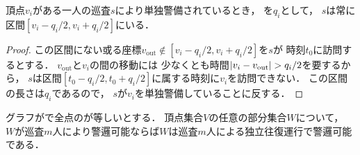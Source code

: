 \begin{lemm}
  \label{lemm:RangeOfPatrollerOnLine}
  頂点$v_i$がある一人の巡査$s$により単独警備されているとき，
  {\maxIdletime}を$q_i$として，
  $s$は常に区間$[v_i - q_i/2, v_i + q_i/2]$にいる．
\end{lemm}
\begin{proof}
  \newcommand{\vout}{v_{\mathrm{out}}}
  この区間にない或る座標$\vout \notin [v_i - q_i/2, v_i + q_i/2]$を$s$が
  時刻$t_0$に訪問するとする．
  $\vout$と$v_i$の間の移動には
  少なくとも時間$\abs{v_i - \vout} > q_i / 2$を要するから，
  $s$は区間$[t_0 - q_i / 2, t_0 + q_i / 2]$に属する時刻に$v_i$を訪問できない．
  この区間の長さは$q_i$であるので，
  $s$が$v_i$を単独警備していることに反する．
\end{proof}


\begin{lemm}
  \label{lemm:LineUnaryIdletimeIndependentInterval}
  グラフが{\graphLine}で全点の{\maxIdletime}が等しいとする．
  頂点集合$V$の任意の部分集合$W$について，
  $W$が巡査$m$人により警邏可能ならば$W$は巡査$m$人による独立往復運行で警邏可能である．
\end{lemm}

